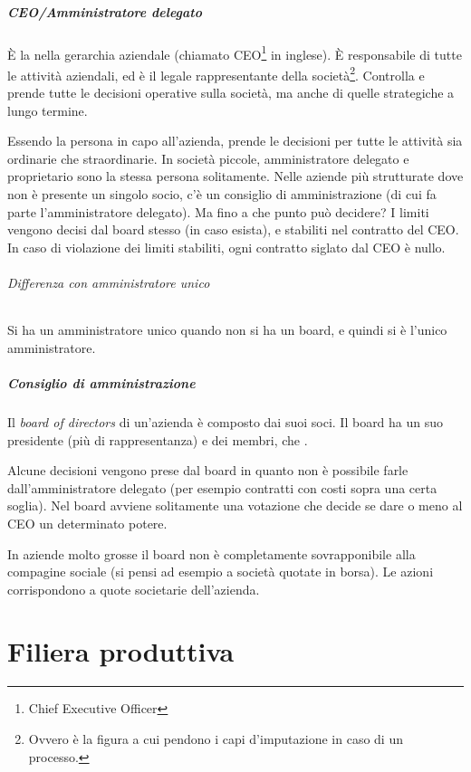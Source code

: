 \paragraph*{CEO/Amministratore delegato} È la  nella gerarchia aziendale (chiamato CEO\footnote{Chief Executive 
Officer} in inglese). È responsabile di tutte le attività aziendali, ed è il 
legale rappresentante della società\footnote{Ovvero è la figura a cui pendono i 
capi d'imputazione in caso di un processo.}. Controlla e prende tutte le 
decisioni operative sulla società, ma anche di quelle strategiche a lungo 
termine.

Essendo la persona in capo all'azienda, prende le decisioni per tutte le
attività sia ordinarie che straordinarie. In società piccole,
amministratore delegato e proprietario sono la stessa persona solitamente. Nelle
aziende più strutturate dove non è presente un singolo socio, c'è un
consiglio di amministrazione (di cui fa parte l'amministratore delegato).
Ma fino a che punto può decidere? I limiti vengono decisi dal board stesso (in
caso esista), e stabiliti nel contratto del CEO. In caso di violazione dei
limiti stabiliti, ogni contratto siglato dal CEO è nullo.

\subparagraph*{Differenza con amministratore unico} Si ha un amministratore
unico quando non si ha un board, e quindi si è l'unico amministratore.

\paragraph*{Consiglio di amministrazione} Il \textit{board of directors} di
un'azienda è composto dai suoi soci. Il board ha un suo presidente (più di
rappresentanza) e dei membri, che .

Alcune decisioni vengono prese dal board in quanto non è possibile farle
dall'amministratore delegato (per esempio contratti con costi sopra una certa
soglia). Nel board avviene solitamente una votazione che decide se dare o meno
al CEO un determinato potere.

In aziende molto grosse il board non è completamente sovrapponibile alla
compagine sociale (si pensi ad esempio a società quotate in borsa). Le azioni
corrispondono a quote societarie dell'azienda.

\chapter{Filiera produttiva}


